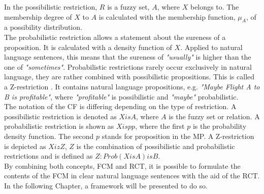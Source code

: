 \documentclass[conference]{IEEEtran}
\begin{document}
In the possibilistic restriction, \begin{math} R \end{math} is a fuzzy set, \begin{math} A \end{math}, where \begin{math} X \end{math} belongs to. The membership degree of \begin{math} X \end{math} to \begin{math} A \end{math} is calculated with the membership function, \begin{math} \mu_{A} \end{math}, of a possibility distribution.\\
The probabilistic restriction allows a statement about the sureness of a proposition. It is calculated with a density function of \begin{math} X \end{math}. Applied to natural language sentences, this means that the sureness of \emph{"usually"} is higher than the one of \emph{"sometimes"}. Probabilistic restrictions rarely occur exclusively in natural language, they are rather combined with possibilistic propositions. This is called a Z-restriction \cite{zadeh2013}. It contains natural language propositions, e.g. \emph{"Maybe Flight A to B is profitable"}, where \emph{"profitable"} is possibilistic and \emph{"maybe"} probabilistic.\\
The notation of the CF is differing depending on the type of restriction. A possibilistic restriction is denoted as \begin{math} X is A \end{math}, where \begin{math} A \end{math} is the fuzzy set or relation. A probabilistic restriction is shown as \begin{math} X isp p \end{math}, where the first \begin{math} p \end{math} is the probability density function. The second \begin{math} p \end{math} stands for proposition in the MP. A Z-restriction is depicted as \begin{math} X iz Z \end{math}, \begin{math} Z \end{math} is the combination of possibilistic and probabilistic restrictions and is defined as \begin{math} Z: Prob(X is A) is B \end{math}.\\
By combining both concepts, FCM and RCT, it is possible to formulate the contents of the FCM in clear natural language sentences with the aid of the RCT. In the following Chapter, a framework will be presented to do so.
\end{document}
